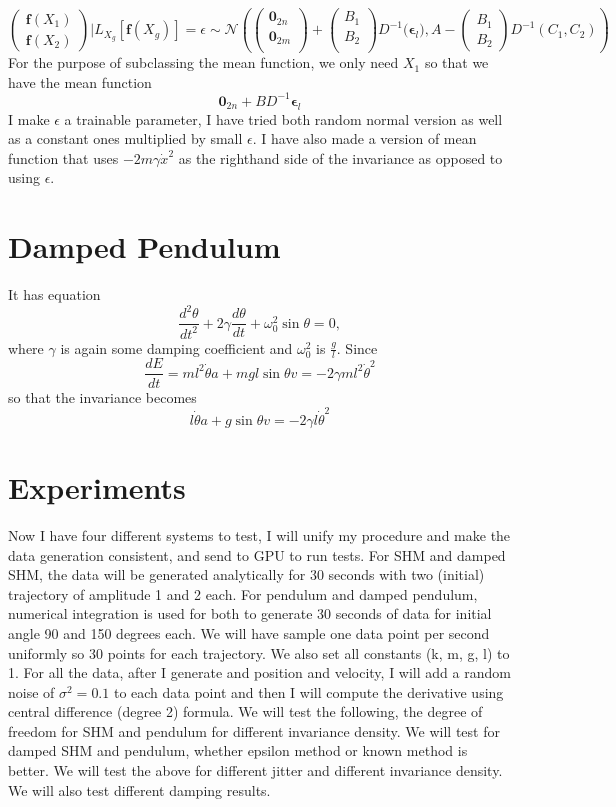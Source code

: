 \documentclass{article}
\begin{document}
$$
\begin{pmatrix}
  \mathbf{f}(X_1)\\
  \mathbf{f}(X_2)
\end{pmatrix}|L_{X_g}[\mathbf{f}(X_g)]=\epsilon
\sim\mathcal{N}
\left(
\begin{pmatrix}
  \mathbf{0}_{2n}\\
  \mathbf{0}_{2m}\\
\end{pmatrix}
+
\begin{pmatrix}
  B_1\\B_2\\
\end{pmatrix}
D^{-1}
\bigg(\mathbf{\epsilon}_l\bigg)
,
A-\begin{pmatrix}
  B_1 \\B_2
\end{pmatrix}D^{-1}\left(C_1, C_2\right)
\right)
$$
For the purpose of subclassing the mean function, we only need $X_1$ so that we have the mean function $$\mathbf{0}_{2n}+BD^{-1}\mathbf{\epsilon}_l$$
I make $\epsilon$ a trainable parameter, I have tried both random normal version as well as a constant ones multiplied by small $\epsilon$.
I have also made a version of mean function that uses $-2m\gamma\dot{x}^2$ as the righthand side of the invariance as opposed to using $\epsilon$.
\section*{Damped Pendulum}
It has equation
$$
\frac{d^2\theta}{dt^2} + 2\gamma\frac{d\theta}{dt} + \omega_0^2\sin\theta = 0, 
$$
where $\gamma$ is again some damping coefficient and $\omega_0^2$ is $\frac{g}{l}$.
Since 
$$
\frac{dE}{dt} = ml^2\dot{\theta}a+mgl\sin\theta v = -2\gamma ml^2\dot{\theta}^2
$$
so that the invariance becomes 
$$
l\dot{\theta}a+g\sin\theta v = -2\gamma l\dot{\theta}^2
$$
\section*{Experiments}
Now I have four different systems to test, I will unify my procedure and make the data generation consistent, and send to GPU to run tests. 
For SHM and damped SHM, the data will be generated analytically for 30 seconds with two (initial) trajectory of amplitude 1 and 2 each.
For pendulum and damped pendulum, numerical integration is used for both to generate 30 seconds of data for initial angle 90 and 150 degrees each.
We will have sample one data point per second uniformly so 30 points for each trajectory.
We also set all constants (k, m, g, l) to 1.
For all the data, after I generate and position and velocity, I will add a random noise of $\sigma^2=0.1$ to each data point and then I will compute the derivative using central difference (degree 2) formula.
We will test the following, the degree of freedom for SHM and pendulum for different invariance density.
We will test for damped SHM and pendulum, whether epsilon method or known method is better.
We will test the above for different jitter and different invariance density.
We will also test different damping results.
\end{document}
